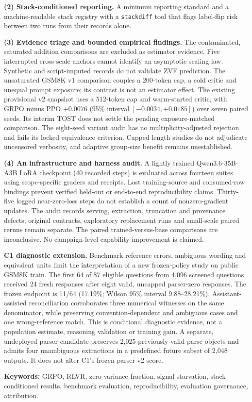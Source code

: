 \textbf{(2) Stack-conditioned reporting.} A minimum reporting standard and a
machine-readable stack registry with a \texttt{stackdiff} tool that flags
label-flip risk between two runs from their records alone.

\textbf{(3) Evidence triage and bounded empirical findings.} The contaminated, saturated addition comparisons are excluded as estimator evidence. Five interrupted cross-scale anchors cannot identify an asymptotic scaling law. Synthetic and script-imputed records do not validate ZVF prediction. The unsaturated GSM8K v1 comparison couples a 200-token cap, a cold critic and unequal prompt exposure; its contrast is not an estimator effect. The existing provisional v2 snapshot uses a 512-token cap and warm-started critic, with GRPO minus PPO $+0.0076$ (95\% interval $[-0.0034,+0.0185]$) over seven paired seeds. Its interim TOST does not settle the pending exposure-matched comparison. The eight-seed variant audit has no multiplicity-adjusted rejection and fails its locked equivalence criterion. Capped length studies do not adjudicate uncensored verbosity, and adaptive group-size benefit remains unestablished.

\textbf{(4) An infrastructure and harness audit.} A lightly trained Qwen3.6-35B-A3B LoRA checkpoint (40 recorded steps) is evaluated across fourteen suites using scope-specific graders and receipts. Lost training-source and consumed-row bindings prevent verified held-out or end-to-end reproducibility claims. Thirty-five logged near-zero-loss steps do not establish a count of nonzero-gradient updates. The audit records serving, extraction, truncation and provenance defects; original contracts, exploratory replacement runs and small-scale paired reruns remain separate. The paired trained-versus-base comparisons are inconclusive. No campaign-level capability improvement is claimed.

\textbf{C1 diagnostic extension.} Benchmark reference errors, ambiguous wording and equivalent units limit the interpretation of a new frozen-policy study on public GSM8K train. The first 64 of 87 eligible questions from 4,096 screened questions received 24 fresh responses after eight valid, uncapped parser-zero responses. The frozen endpoint is 11/64 (17.19\%; Wilson 95\% interval 9.88--28.21\%). Assistant-assisted reconciliation corroborates three numerical witnesses on the same denominator, while preserving convention-dependent and ambiguous cases and one wrong-reference match. This is conditional diagnostic evidence, not a population estimate, reasoning validation or training gain. A separate, undeployed parser candidate preserves 2,025 previously valid parse objects and admits four unambiguous extractions in a predefined future subset of 2,048 outputs. It does not alter C1's frozen parser-v2 score.

\vspace{0.25in}
\noindent\textbf{Keywords:} GRPO, RLVR, zero-variance fraction, signal
starvation, stack-conditioned results, benchmark evaluation, reproducibility,
evaluation governance, attribution.

\tableofcontents
\listoffigures
\listoftables
